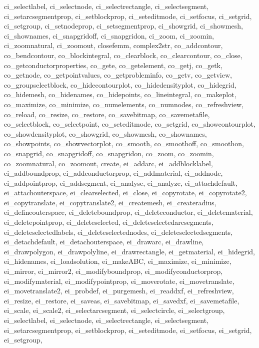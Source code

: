 {{ci_selectlabel, 
ci_selectnode, 
ci_selectrectangle, 
ci_selectsegment, 
ci_setarcsegmentprop, 
ci_setblockprop, 
ci_seteditmode, 
ci_setfocus, 
ci_setgrid, 
ci_setgroup, 
ci_setnodeprop, 
ci_setsegmentprop, 
ci_showgrid, 
ci_showmesh, 
ci_shownames, 
ci_snapgridoff, 
ci_snapgridon, 
ci_zoom, 
ci_zoomin, 
ci_zoomnatural, 
ci_zoomout, 
closefemm, 
complex2str, 
co_addcontour, 
co_bendcontour, 
co_blockintegral, 
co_clearblock, 
co_clearcontour, 
co_close, 
co_getconductorproperties, 
co_gete, 
co_getelement, 
co_getj, 
co_getk, 
co_getnode, 
co_getpointvalues, 
co_getprobleminfo, 
co_getv, 
co_getview, 
co_groupselectblock, 
co_hidecontourplot, 
co_hidedensityplot, 
co_hidegrid, 
co_hidemesh, 
co_hidenames, 
co_hidepoints, 
co_lineintegral, 
co_makeplot, 
co_maximize, 
co_minimize, 
co_numelements, 
co_numnodes, 
co_refreshview, 
co_reload, 
co_resize, 
co_restore, 
co_savebitmap, 
co_savemetafile, 
co_selectblock, 
co_selectpoint, 
co_seteditmode, 
co_setgrid, 
co_showcontourplot, 
co_showdensityplot, 
co_showgrid, 
co_showmesh, 
co_shownames, 
co_showpoints, 
co_showvectorplot, 
co_smooth, 
co_smoothoff, 
co_smoothon, 
co_snapgrid, 
co_snapgridoff, 
co_snapgridon, 
co_zoom, 
co_zoomin, 
co_zoomnatural, 
co_zoomout, 
create, 
ei_addarc, 
ei_addblocklabel, 
ei_addboundprop, 
ei_addconductorprop, 
ei_addmaterial, 
ei_addnode, 
ei_addpointprop, 
ei_addsegment, 
ei_analyse, 
ei_analyze, 
ei_attachdefault, 
ei_attachouterspace, 
ei_clearselected, 
ei_close, 
ei_copyrotate, 
ei_copyrotate2, 
ei_copytranslate, 
ei_copytranslate2, 
ei_createmesh, 
ei_createradius, 
ei_defineouterspace, 
ei_deleteboundprop, 
ei_deleteconductor, 
ei_deletematerial, 
ei_deletepointprop, 
ei_deleteselected, 
ei_deleteselectedarcsegments, 
ei_deleteselectedlabels, 
ei_deleteselectednodes, 
ei_deleteselectedsegments, 
ei_detachdefault, 
ei_detachouterspace, 
ei_drawarc, 
ei_drawline, 
ei_drawpolygon, 
ei_drawpolyline, 
ei_drawrectangle, 
ei_getmaterial, 
ei_hidegrid, 
ei_hidenames, 
ei_loadsolution, 
ei_makeABC, 
ei_maximize, 
ei_minimize, 
ei_mirror, 
ei_mirror2, 
ei_modifyboundprop, 
ei_modifyconductorprop, 
ei_modifymaterial, 
ei_modifypointprop, 
ei_moverotate, 
ei_movetranslate, 
ei_movetranslate2, 
ei_probdef, 
ei_purgemesh, 
ei_readdxf, 
ei_refreshview, 
ei_resize, 
ei_restore, 
ei_saveas, 
ei_savebitmap, 
ei_savedxf, 
ei_savemetafile, 
ei_scale, 
ei_scale2, 
ei_selectarcsegment, 
ei_selectcircle, 
ei_selectgroup, 
ei_selectlabel, 
ei_selectnode, 
ei_selectrectangle, 
ei_selectsegment, 
ei_setarcsegmentprop, 
ei_setblockprop, 
ei_seteditmode, 
ei_setfocus, 
ei_setgrid, 
ei_setgroup, 
}}
